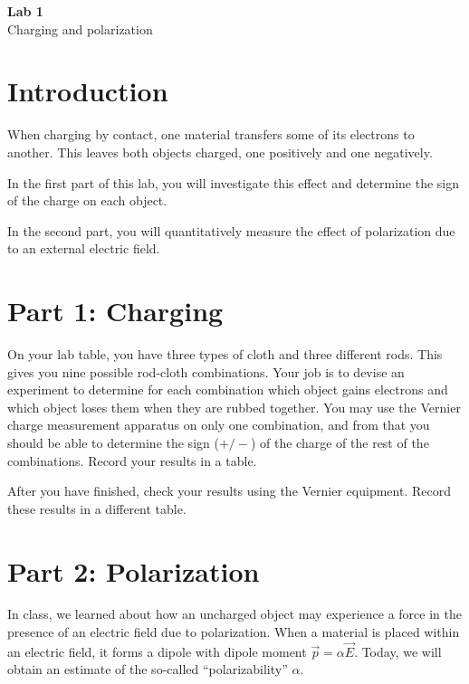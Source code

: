 \documentclass{article}
\begin{document}
\fancyfoot[C]{\thepage}
\vspace*{0cm}
\begin{center}
	{\LARGE \textbf{Lab 1}}\\
	{\Large Charging and polarization}
\end{center}

\section*{Introduction}
When charging by contact, one material transfers some of its electrons to another. This leaves both objects charged, one positively and one negatively. 

In the first part of this lab, you will investigate this effect and determine the sign of the charge on each object.

In the second part, you will quantitatively measure the effect of polarization due to an external electric field.

\section*{Part 1: Charging}
On your lab table, you have three types of cloth and three different rods. This gives you nine possible rod-cloth combinations. Your job is to devise an experiment to determine for each combination which object gains electrons and which object loses them when they are rubbed together. You may use the Vernier charge measurement apparatus on only one combination, and from that you should be able to determine the sign ($+/-$) of the charge of the rest of the combinations. Record your results in a table.

After you have finished, check your results using the Vernier equipment. Record these results in a different table.

\section*{Part 2: Polarization}
In class, we learned about how an uncharged object may experience a force in the presence of an electric field due to polarization. When a material is placed within an electric field, it forms a dipole with dipole moment $\vec{p}=\alpha\vec{E}$. Today, we will obtain an estimate of the so-called ``polarizability'' $\alpha$. 
\end{document}

